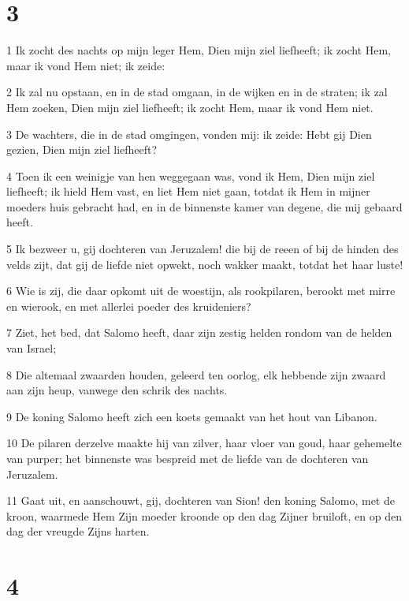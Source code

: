 \chapter{3}

\par 1 Ik zocht des nachts op mijn leger Hem, Dien mijn ziel liefheeft; ik zocht Hem, maar ik vond Hem niet; ik zeide:
\par 2 Ik zal nu opstaan, en in de stad omgaan, in de wijken en in de straten; ik zal Hem zoeken, Dien mijn ziel liefheeft; ik zocht Hem, maar ik vond Hem niet.
\par 3 De wachters, die in de stad omgingen, vonden mij: ik zeide: Hebt gij Dien gezien, Dien mijn ziel liefheeft?
\par 4 Toen ik een weinigje van hen weggegaan was, vond ik Hem, Dien mijn ziel liefheeft; ik hield Hem vast, en liet Hem niet gaan, totdat ik Hem in mijner moeders huis gebracht had, en in de binnenste kamer van degene, die mij gebaard heeft.
\par 5 Ik bezweer u, gij dochteren van Jeruzalem! die bij de reeen of bij de hinden des velds zijt, dat gij de liefde niet opwekt, noch wakker maakt, totdat het haar luste!
\par 6 Wie is zij, die daar opkomt uit de woestijn, als rookpilaren, berookt met mirre en wierook, en met allerlei poeder des kruideniers?
\par 7 Ziet, het bed, dat Salomo heeft, daar zijn zestig helden rondom van de helden van Israel;
\par 8 Die altemaal zwaarden houden, geleerd ten oorlog, elk hebbende zijn zwaard aan zijn heup, vanwege den schrik des nachts.
\par 9 De koning Salomo heeft zich een koets gemaakt van het hout van Libanon.
\par 10 De pilaren derzelve maakte hij van zilver, haar vloer van goud, haar gehemelte van purper; het binnenste was bespreid met de liefde van de dochteren van Jeruzalem.
\par 11 Gaat uit, en aanschouwt, gij, dochteren van Sion! den koning Salomo, met de kroon, waarmede Hem Zijn moeder kroonde op den dag Zijner bruiloft, en op den dag der vreugde Zijns harten.

\chapter{4}

